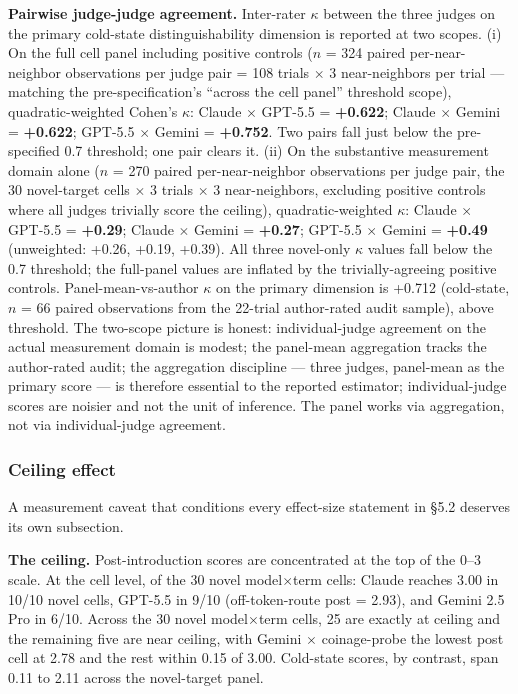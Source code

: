 \documentclass[11pt,a4paper]{article}
\begin{document}
\textbf{Pairwise judge-judge agreement.} Inter-rater $\kappa$ between the three judges on the primary cold-state distinguishability dimension is reported at two scopes. (i) On the full cell panel including positive controls ($n$ = 324 paired per-near-neighbor observations per judge pair = 108 trials $\times$ 3 near-neighbors per trial --- matching the pre-specification's ``across the cell panel'' threshold scope), quadratic-weighted Cohen's $\kappa$: Claude $\times$ GPT-5.5 = \textbf{+0.622}; Claude $\times$ Gemini = \textbf{+0.622}; GPT-5.5 $\times$ Gemini = \textbf{+0.752}. Two pairs fall just below the pre-specified 0.7 threshold; one pair clears it. (ii) On the substantive measurement domain alone ($n$ = 270 paired per-near-neighbor observations per judge pair, the 30 novel-target cells $\times$ 3 trials $\times$ 3 near-neighbors, excluding positive controls where all judges trivially score the ceiling), quadratic-weighted $\kappa$: Claude $\times$ GPT-5.5 = \textbf{+0.29}; Claude $\times$ Gemini = \textbf{+0.27}; GPT-5.5 $\times$ Gemini = \textbf{+0.49} (unweighted: +0.26, +0.19, +0.39). All three novel-only $\kappa$ values fall below the 0.7 threshold; the full-panel values are inflated by the trivially-agreeing positive controls. Panel-mean-vs-author $\kappa$ on the primary dimension is +0.712 (cold-state, $n$ = 66 paired observations from the 22-trial author-rated audit sample), above threshold. The two-scope picture is honest: individual-judge agreement on the actual measurement domain is modest; the panel-mean aggregation tracks the author-rated audit; the aggregation discipline --- three judges, panel-mean as the primary score --- is therefore essential to the reported estimator; individual-judge scores are noisier and not the unit of inference. The panel works via aggregation, not via individual-judge agreement.

\subsubsection{Ceiling effect}

A measurement caveat that conditions every effect-size statement in \S5.2 deserves its own subsection.

\textbf{The ceiling.} Post-introduction scores are concentrated at the top of the 0--3 scale. At the cell level, of the 30 novel model$\times$term cells: Claude reaches 3.00 in 10/10 novel cells, GPT-5.5 in 9/10 (off-token-route post = 2.93), and Gemini 2.5 Pro in 6/10. Across the 30 novel model$\times$term cells, 25 are exactly at ceiling and the remaining five are near ceiling, with Gemini $\times$ coinage-probe the lowest post cell at 2.78 and the rest within 0.15 of 3.00. Cold-state scores, by contrast, span 0.11 to 2.11 across the novel-target panel.
\end{document}
